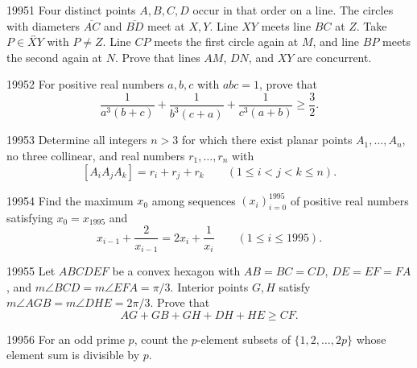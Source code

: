 
\begin{problem}{1995}{1}
Four distinct points $A, B, C, D$ occur in that order on a line. The circles with diameters $\overline{AC}$ and $\overline{BD}$ meet at $X, Y$. Line $XY$ meets line $BC$ at $Z$. Take $P\in\overleftrightarrow{XY}$ with $P\ne Z$. Line $CP$ meets the first circle again at $M$, and line $BP$ meets the second again at $N$. Prove that lines $AM$, $DN$, and $XY$ are concurrent.
\end{problem}

\begin{problem}{1995}{2}
For positive real numbers $a, b, c$ with $abc=1$, prove that
\[
    \frac{1}{a^3(b+c)}+\frac{1}{b^3(c+a)}+\frac{1}{c^3(a+b)}\geq\frac32.
\]
\end{problem}

\begin{problem}{1995}{3}
Determine all integers $n>3$ for which there exist planar points $A_1, \dots, A_n$, no three collinear, and real numbers $r_1, \dots, r_n$ with
\[
    [A_iA_jA_k]=r_i+r_j+r_k\qquad(1\leq i<j<k\leq n).
\]
\end{problem}

\begin{problem}{1995}{4}
Find the maximum $x_0$ among sequences $(x_i)_{i=0}^{1995}$ of positive real numbers satisfying $x_0=x_{1995}$ and
\[
    x_{i-1}+\frac{2}{x_{i-1}}=2x_i+\frac1{x_i}\qquad(1\leq i\leq1995).
\]
\end{problem}

\begin{problem}{1995}{5}
Let $ABCDEF$ be a convex hexagon with $AB=BC=CD$, $DE=EF=FA$, and $m\angle BCD=m\angle EFA=\pi/3$. Interior points $G, H$ satisfy $m\angle AGB=m\angle DHE=2\pi/3$. Prove that
\[
    AG+GB+GH+DH+HE\geq CF.
\]
\end{problem}

\begin{problem}{1995}{6}
For an odd prime $p$, count the $p$-element subsets of $\{1, 2, \dots, 2p\}$ whose element sum is divisible by $p$.
\end{problem}

